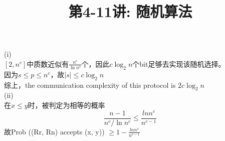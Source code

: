 \documentclass[a4paper, justified]{tufte-handout}
\title{第4-11讲: 随机算法}
\date{\zhtoday} %
\begin{document}
\maketitle
\noplagiarism %
\begin{abstract}
\end{abstract}
\beginrequired

\begin{problem}[JH 5.2.2.7]
\end{problem}

\begin{solution}
(i)\\
$[2,n^c]$中质数近似有$\frac{n^c}{\ln n^c}$个，因此$c\log_2{n}$个bit足够去实现该随机选择。\\
因为$s\leq p\leq n^c$，故$|s|\leq c\log_2{n}$\\
综上，the communication complexity of this protocol is $2c\log_2{n}$\\
(ii)\\
在$x\leq y$时，被判定为相等的概率
\[
\frac{n-1}{n^c/\ln n^c}\leq  \frac{ln n^c}{n^{c-1}}
\]
故Prob ((Rr, Rn) accepts (x, y)) $\geq 1 -\frac{ln n^c}{n^{c-1}} $
\end{solution}

\begin{problem}[JH 5.2.2.8]
\end{problem}
\end{document}
